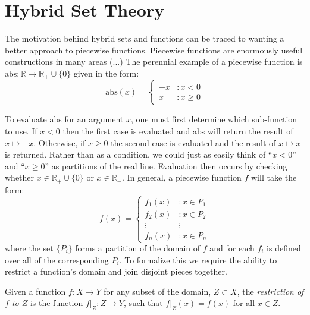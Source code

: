 \chapter{Hybrid Set Theory}


%
%


The motivation behind hybrid sets and functions can be traced to wanting a better approach to piecewise functions.
Piecewise functions are enormously useful constructions in many areas (...)
The perennial example of a piecewise function is $\mathrm{abs}:\mathbb{R} \to \mathbb{R}_{+} \cup \{ 0 \}$ given in the form:
\begin{equation}
	\mathrm{abs}(x) = 
  		\left\{
     			\begin{array}{lr}
       			-x & : x < 0 \\
       			x & : x \geq 0
     			\end{array}
   		\right.
\end{equation}


To evaluate abs for an argument $x$, one must first determine which sub-function to use. 
If $x < 0$ then the first case is evaluated and abs will return the result of $x \mapsto -x$. 
Otherwise, if $x \geq 0$ the second case is evaluated and the result of $x \mapsto x$ is returned. 
Rather than as a condition, we could just as easily think of ``$x<0$'' and ``$x \geq 0$'' as partitions of the real line.
Evaluation then occurs by checking whether $x\in \mathbb{R}_{+} \cup \{ 0 \} $ or $x \in \mathbb{R}_{-}$.
In general, a piecewise function $f$ will take the form:
\begin{equation}
\label{eq_fP}
	f(x) = 
	  \left\{
	     \begin{array}{lr}
	       f_1(x) & : x \in P_1 \\
	       f_2(x) & : x \in P_2 \\ 
	       \vdots & \vdots \\
	       f_n(x) & : x \in P_n
	     \end{array}
	   \right.
\end{equation}
where the set $\{ P _ i \}$ forms a partition of the domain of $f$ and for each $f_i$ is defined over all of the corresponding $P_i$. To formalize this we require the ability to restrict a function's domain and join disjoint pieces together.


\begin{definition}
	Given a function $f:X \to Y$ for any subset of the domain, 
	$Z \subset X$, the \emph{restriction of $f$ to $Z$} is the function $f|_Z : Z \to Y$, 
	such that $f|_Z(x) = f(x)$ for all $x \in Z$.
\end{definition}


